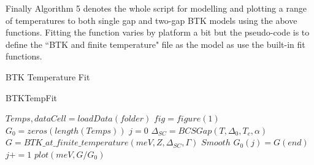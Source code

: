 Finally Algorithm 5 denotes the whole script for modelling and plotting a range of temperatures to both single gap and two-gap BTK models using the above functions. Fitting the function varies by platform a bit but the pseudo-code is to define the ``BTK and finite temperature" file as the model as use the built-in fit functions.
\begin{algorithm}
\caption{BTK Temperature Fit}{BTKTempFit}
\begin{algorithmic}[1]
\State $Temps, dataCell = loadData(folder)$
\State $fig = figure(1)$
\State $G_{0} = zeros(length(Temps))$
\State $j = 0$
\State $\Delta_{SC} = BCSGap(T,\Delta_{0},T_{c},\alpha)$
\State $G = BTK\_at\_finite\_temperature(meV, Z, \Delta_{SC}, \Gamma)$
\State $Smooth$
\State $G_{0}(j) = G(end)$
\State $j += 1$
\State $plot(meV, G/G_{0})$
\EndFor
\end{algorithmic}
\end{algorithm}